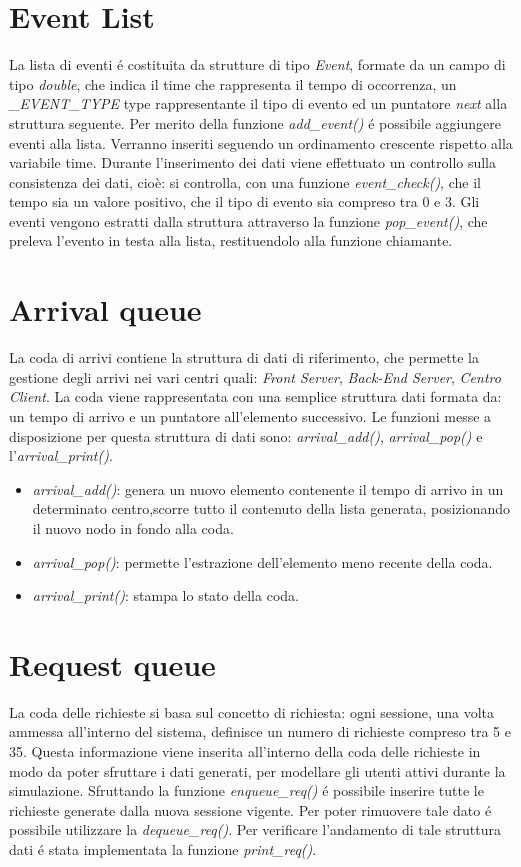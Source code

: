 \section{Event List}
La lista di eventi \'e costituita da strutture di tipo \textit{Event}, formate da un campo di tipo \textit{double}, che indica il time che rappresenta il tempo di occorrenza, un \textit{\_EVENT\_TYPE} type rappresentante il tipo di evento ed un puntatore \textit{next} alla struttura seguente.
Per merito della funzione \textit{add\_event()} \'e possibile aggiungere eventi alla lista. Verranno inseriti seguendo un ordinamento crescente rispetto alla variabile time. Durante l'inserimento dei dati viene effettuato un controllo sulla consistenza dei dati, cioè: si controlla, con una funzione \textit{event\_check()}, che il tempo sia un valore positivo, che il tipo di evento sia compreso tra 0 e 3.
Gli eventi vengono estratti dalla struttura attraverso la funzione \textit{pop\_event()}, che preleva l'evento in testa alla lista, restituendolo alla funzione chiamante.

\section{Arrival queue}
La coda di arrivi contiene la struttura di dati di riferimento, che permette la gestione degli arrivi nei vari centri quali: \textit{Front Server}, \textit{Back-End Server}, \textit{Centro Client}. La coda viene rappresentata con una semplice struttura dati formata da: un tempo di arrivo e un puntatore all'elemento successivo. Le funzioni messe a disposizione per questa struttura di dati sono: \textit{arrival\_add()}, \textit{arrival\_pop()} e l'\textit{arrival\_print()}.
\begin{itemize}
\item \textit{arrival\_add()}: genera un nuovo elemento contenente il tempo di arrivo in un determinato centro,scorre tutto il contenuto della lista generata, posizionando il nuovo nodo in fondo alla coda.
\item \textit{arrival\_pop()}: permette l'estrazione dell'elemento meno recente della coda.
\item \textit{arrival\_print()}: stampa lo stato della coda.
\end{itemize}

\section{Request queue}
La coda delle richieste si basa sul concetto di richiesta: ogni sessione, una volta ammessa all'interno del sistema, definisce un numero di richieste compreso tra 5 e 35. Questa informazione viene inserita all'interno della coda delle richieste in modo da poter sfruttare i dati generati, per modellare gli utenti attivi durante la simulazione.
Sfruttando la funzione \textit{enqueue\_req()} \'e possibile inserire tutte le richieste generate dalla nuova sessione vigente. Per poter rimuovere tale dato \'e possibile  utilizzare la \textit{dequeue\_req()}.
Per verificare l'andamento di tale struttura dati \'e stata implementata la funzione \textit{print\_req()}.

